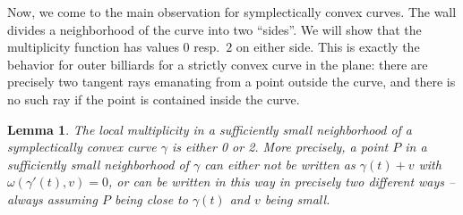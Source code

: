 \documentclass[12pt]{article}
\newtheorem{lemma}{Lemma}[section]
\newcommand{\g}{{\gamma}}
\newcommand{\R}{{\mathbb R}}
\begin{document}

Now, we come to the main observation for symplectically convex curves. The wall divides a neighborhood of the curve into two ``sides''. We will show that the multiplicity function has values $0$ resp.~$2$ on either side. This is exactly the behavior for outer billiards for a strictly convex curve in the plane: there are precisely two tangent rays emanating from a point outside the curve, and there is no such ray if the point is contained inside the curve.

\begin{lemma} \label{lm:0or2}
The local multiplicity in a sufficiently small neighborhood of a symplectically convex curve $\gamma$ is either 0 or 2. More precisely, a point $P$ in a sufficiently small neighborhood of $\gamma$ can either not be written as $\gamma(t)+v$ with $\omega(\gamma'(t),v)=0$, or can be written in this way in precisely two different ways -- always assuming $P$ being close to $\gamma(t)$ and $v$ being small.
\end{lemma}
\end{document}
